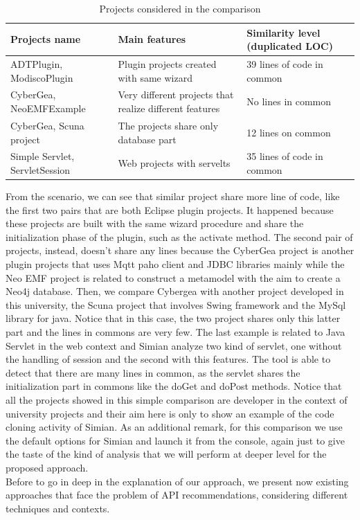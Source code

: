 \begin{center}
\begin{table}[H]
  \caption{ Projects considered in the comparison }
  \label{Table:4}
\begin{adjustbox}{width=1\textwidth}
\small
\begin{tabular}{|l|p{5cm}|p{3cm}|}

\hline
 \textbf{Projects name} &  \textbf{Main features}  & \textbf{Similarity level (duplicated LOC)}  \\
\hline
 ADTPlugin, ModiscoPlugin   &  Plugin projects created with same wizard & 39 lines of code in common\\
\hline
CyberGea, NeoEMFExample &   Very different projects that realize different features & No lines in common\\
\hline
CyberGea, Scuna project & The projects share only database part & 12 lines on common  \\
\hline
Simple Servlet, ServletSession &  Web projects with servelts & 35 lines of code in common  \\
\hline
\end{tabular}

\end{adjustbox}
\end{table} 
\end{center}

From the scenario, we can see that similar project share more line of code, like the first two pairs that are both Eclipse plugin projects. It happened because these projects are built with the same wizard procedure and share the initialization phase of the plugin, such as the activate method. The second pair of projects, instead, doesn't share any lines because the CyberGea project is another plugin projects that uses Mqtt paho client and JDBC libraries mainly while the Neo EMF project is related to construct a metamodel with the aim to create a Neo4j database. Then, we compare Cybergea with another project developed in this university, the Scuna project that involves Swing framework and the MySql library for java. Notice that in this case, the two project shares only this latter part and the lines in commons are very few. The last example is related to Java Servlet in the web context and Simian analyze two kind of servlet, one without the handling of session and the second with this features. The tool is able to detect that there are many lines in common, as the servlet shares the initialization part in commons like the doGet and doPost methods. Notice that all the projects showed in this simple comparison are developer in the context of university projects and their aim here is only to show an example of the code cloning activity of Simian. As an additional remark, for this comparison we use the default options for Simian and launch it from the console, again just to give the taste of the kind of analysis that we will perform at deeper level for the proposed approach. \\ 
Before to go in deep in the explanation of our approach, we present now existing approaches that face the problem of API recommendations, considering different techniques and contexts.